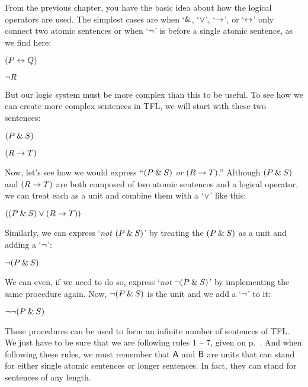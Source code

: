 From the previous chapter, you have the basic idea about how the logical operators are used. The simplest cases are when `$\mathbin{\&}$, `$\vee$', `$\rightarrow$', or `$\leftrightarrow$' only connect two atomic sentences or when `${\neg}$' is before a single atomic sentence, as we find here:  
\begin{earg}
\item[] $(P \leftrightarrow Q)$
\item[] ${\neg} R$
\end{earg}
But our logic system must be more complex than this to be useful. To see how we can create more complex sentences in TFL, we will start with these two sentences:
\begin{earg}
\item[] $(P \mathbin{\&} S)$
\item[] $(R \rightarrow T)$
\end{earg}
Now, let’s see how we would express ``$(P \mathbin{\&} S)$ \textit{or} $(R \rightarrow T)$.'' Although 
$(P \mathbin{\&} S)$ and
$(R \rightarrow T)$
are both composed of two atomic sentences and a logical operator, we can treat each as a unit and combine them with a `$\vee$’ like this:
\begin{earg}
\item[]$((P \mathbin{\&} S) \vee (R \rightarrow T))$
\end{earg}
\noindent Similarly, we can express `\textit{not} $(P \mathbin{\&} S)$' by treating the $(P \mathbin{\&} S)$ as a unit and adding a `${\neg}$’:
\begin{earg}
\item[] ${\neg}(P \mathbin{\&} S)$
\end{earg}
We can even, if we need to do so, express `\textit{not} ${\neg}(P \mathbin{\&} S)$' by implementing the same procedure again. Now, ${\neg}(P \mathbin{\&} S)$ is the unit and we add a `${\neg}$’ to it:
\begin{earg}
\item[] ${\neg}{\neg}(P \mathbin{\&} S)$
\end{earg}

These procedures can be used to form an infinite number of sentences of TFL. We just have to be sure that we are following rules 1 -- 7, given on p.~\pageref{TFLsentences}.  And when following these rules, we must remember that $\mathsf{A}$ and $\mathsf{B}$ are units that can stand for either single atomic sentences or longer sentences. In fact, they can stand for sentences of any length.


